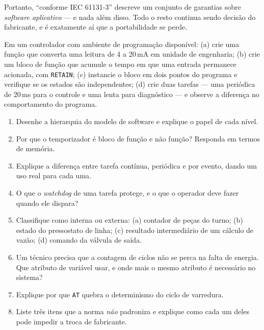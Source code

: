Portanto, ``conforme IEC 61131-3'' descreve um conjunto de garantias sobre \emph{software aplicativo}
--- e nada além disso. Todo o resto continua sendo decisão do fabricante, e é exatamente aí que a
portabilidade se perde.

\begin{pratica}
Em um controlador com ambiente de programação disponível:
(a) crie uma função que converta uma leitura de 4 a 20\,mA em unidade de engenharia;
(b) crie um bloco de função que acumule o tempo em que uma entrada permanece acionada, com
\texttt{RETAIN};
(c) instancie o bloco em dois pontos do programa e verifique se os estados são independentes;
(d) crie duas tarefas --- uma periódica de 20\,ms para o controle e uma lenta para diagnóstico --- e
observe a diferença no comportamento do programa.
\end{pratica}

\begin{exercicios}
\begin{enumerate}[label=\alph*)]
  \item Desenhe a hierarquia do modelo de software e explique o papel de cada nível.
  \item Por que o temporizador é bloco de função e não função? Responda em termos de memória.
  \item Explique a diferença entre tarefa contínua, periódica e por evento, dando um uso real para
        cada uma.
  \item O que o \emph{watchdog} de uma tarefa protege, e o que o operador deve fazer quando ele
        dispara?
  \item Classifique como interna ou externa: (a) contador de peças do turno; (b) estado do
        pressostato de linha; (c) resultado intermediário de um cálculo de vazão; (d) comando da
        válvula de saída.
  \item Um técnico precisa que a contagem de ciclos não se perca na falta de energia. Que atributo de
        variável usar, e onde mais o mesmo atributo é necessário no sistema?
  \item Explique por que \texttt{AT} quebra o determinismo do ciclo de varredura.
  \item Liste três itens que a norma \emph{não} padroniza e explique como cada um deles pode impedir
        a troca de fabricante.
\end{enumerate}
\end{exercicios}
